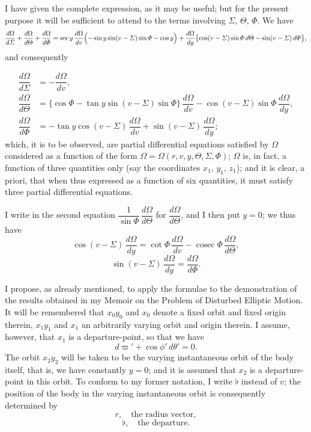 \documentclass[12pt,a4paper]{article}
\providecommand{\cosec}{\mathop{\mathrm{cosec}}}
\theoremstyle{plain}
\begin{document}
\medskip
I have given the complete expression, as it may be useful; but for the present purpose it will be sufficient to attend to the terms involving $\varSigma$, $\Theta$, $\varPhi$. We have
\[
\dfrac{d\Omega}{d\varSigma}+\dfrac{d\Omega}{d\Theta}+\dfrac{d\Omega}{d\varPhi}=
\sec y\,\dfrac{d\Omega}{dv}\Bigl(-\sin y\sin(v-\varSigma)\sin\varPhi-\cos y\Bigr)+\dfrac{d\Omega}{dy}\bigl\{\cos(v-\varSigma)\sin\varPhi\,d\Theta-\sin(v-\varSigma)\,d\varPhi\bigr\},
\]
and consequently

\newpage
{}
\begin{align*}
\dfrac{d\Omega}{d\varSigma} &= -\dfrac{d\Omega}{dv},\\
\dfrac{d\Omega}{d\Theta} &= \bigl\{\cos\varPhi-\tan y\sin(v-\varSigma)\sin\varPhi\bigr\}\,\dfrac{d\Omega}{dv}-\cos(v-\varSigma)\sin\varPhi\,\dfrac{d\Omega}{dy},\\
\dfrac{d\Omega}{d\varPhi} &= -\tan y\cos(v-\varSigma)\,\dfrac{d\Omega}{dv}+\sin(v-\varSigma)\,\dfrac{d\Omega}{dy};
\end{align*}
which, it is to be observed, are partial differential equations satisfied by $\Omega$ considered as a function of the form $\Omega=\Omega(r,v,y,\Theta,\varSigma,\varPhi)$; $\Omega$ is, in fact, a function of three quantities only (say the coordinates $x_{1}$, $y_{1}$, $z_{1}$); and it is clear, a priori, that when thus expressed as a function of six quantities, it must satisfy three partial differential equations.

\medskip
I write in the second equation $\dfrac{1}{\sin\varPhi}\,\dfrac{d\Omega}{d\Theta}$ for $\dfrac{d\Omega}{d\Theta}$, and I then put $y=0$; we thus have
\[
\cos(v-\varSigma)\,\dfrac{d\Omega}{dy}=\cot\varPhi\,\dfrac{d\Omega}{dv}-\cosec\varPhi\,\dfrac{d\Omega}{d\Theta},
\]
\[
\sin(v-\varSigma)\,\dfrac{d\Omega}{dy}=\dfrac{d\Omega}{d\varPhi}.
\]

\medskip
I propose, as already mentioned, to apply the formulae to the demonstration of the results obtained in my Memoir on the Problem of Disturbed Elliptic Motion. It will be remembered that $x_{0}y_{0}$ and $x_{0}$ denote a fixed orbit and fixed origin therein, $x_{1}y_{1}$ and $x_{1}$ an arbitrarily varying orbit and origin therein. I assume, however, that $x_{1}$ is a departure-point, so that we have
\[
d\varpi'+\cos\phi'\,d\theta'=0.
\]
The orbit $x_{2}y_{2}$ will be taken to be the varying instantaneous orbit of the body itself, that is, we have constantly $y=0$; and it is assumed that $x_{2}$ is a departure-point in this orbit. To conform to my former notation, I write $\flat$ instead of $v$; the position of the body in the varying instantaneous orbit is consequently determined by
\[
r,\quad \text{the radius vector},
\]
\[
\flat,\quad \text{the departure}.
\]
\end{document}
